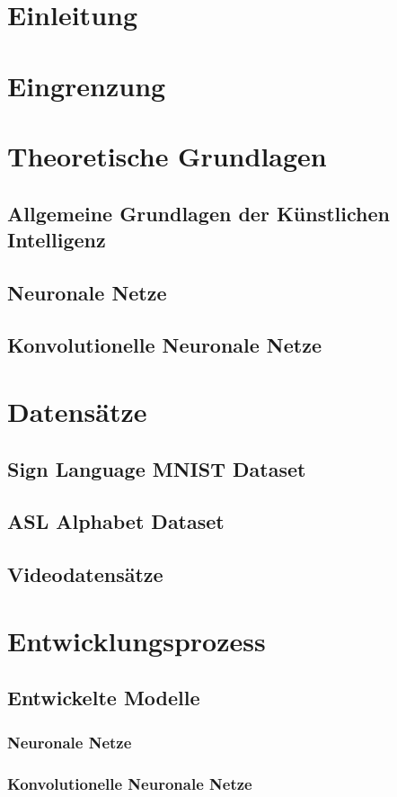 \documentclass[11pt,bibliography=totocnumbered]{scrartcl}
\begin{document}
\section{Einleitung}
\section{Eingrenzung}
\section{Theoretische Grundlagen}
\subsection{Allgemeine Grundlagen der Künstlichen Intelligenz}
\subsection{Neuronale Netze}
\subsection{Konvolutionelle Neuronale Netze}
\section{Datensätze}
\subsection{Sign Language MNIST Dataset}
\subsection{ASL Alphabet Dataset}
\subsection{Videodatensätze}
\section{Entwicklungsprozess}
\subsection{Entwickelte Modelle}
\subsubsection{Neuronale Netze}
\subsubsection{Konvolutionelle Neuronale Netze}
\end{document}
